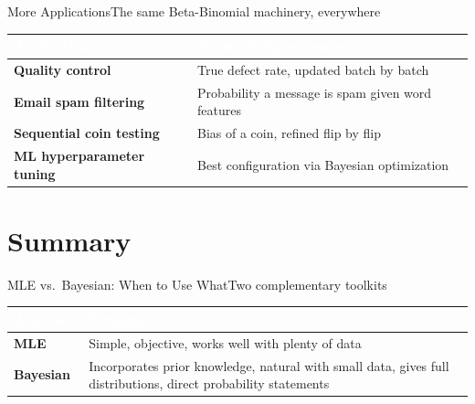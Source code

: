\documentclass[aspectratio=169,11pt]{beamer}
\begin{document}
\begin{frame}{More Applications}{The same Beta-Binomial machinery, everywhere}
  \small
  \renewcommand{\arraystretch}{1.3}
  \begin{center}
  \begin{tabularx}{\textwidth}{@{}>{\bfseries}l >{\raggedright\arraybackslash}X@{}}
    \toprule
    \rowcolor{PrimaryDark}
    \textcolor{white}{Application} & \textcolor{white}{What's being estimated} \\
    \midrule
    Quality control & True defect rate, updated batch by batch \\
    \rowcolor{PrimaryLight!25}
    Email spam filtering & Probability a message is spam given word features \\
    Sequential coin testing & Bias of a coin, refined flip by flip \\
    \rowcolor{PrimaryLight!25}
    ML hyperparameter tuning & Best configuration via Bayesian optimization \\
    \bottomrule
  \end{tabularx}
  \end{center}
\end{frame}

\section{Summary}

\begin{frame}{MLE vs.\ Bayesian: When to Use What}{Two complementary toolkits}
  \small
  \renewcommand{\arraystretch}{1.3}
  \begin{center}
  \begin{tabularx}{\textwidth}{@{}>{\bfseries}l >{\raggedright\arraybackslash}X@{}}
    \toprule
    \rowcolor{PrimaryDark}
    \textcolor{white}{Approach} & \textcolor{white}{Strengths} \\
    \midrule
    MLE & Simple, objective, works well with plenty of data \\
    \rowcolor{PrimaryLight!25}
    Bayesian & Incorporates prior knowledge, natural with small data,
    gives full distributions, direct probability statements \\
    \bottomrule
  \end{tabularx}
  \end{center}
\end{frame}
\end{document}
